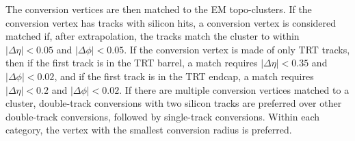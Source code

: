 \documentclass[a4paper, oneside, 11pt, openright]{book}
\begin{document}
			The conversion vertices are then matched to the EM topo-clusters. If the conversion vertex has tracks with silicon hits, a conversion vertex is considered matched if, after extrapolation, the tracks match the cluster to within $|\Delta\eta| < 0.05$ and $|\Delta\phi| < 0.05$. If the conversion vertex is made of only TRT tracks, then if the first track is in the TRT barrel, a match requires $|\Delta\eta| < 0.35$ and $|\Delta\phi| < 0.02$, and if the first track is in the TRT endcap, a match requires $|\Delta\eta| < 0.2$ and $|\Delta\phi| < 0.02$. If there are multiple conversion vertices matched to a cluster, double-track conversions with two silicon tracks are preferred over other double-track conversions, followed by single-track conversions. Within each category, the vertex with the smallest conversion radius is preferred.
		
\end{document}
